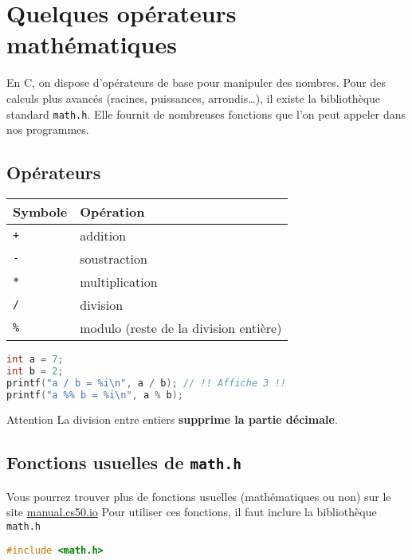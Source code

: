 
\section{Quelques opérateurs mathématiques}

En C, on dispose d’opérateurs de base pour manipuler des nombres.
Pour des calculs plus avancés (racines, puissances, arrondis…), il existe la bibliothèque standard \texttt{math.h}.
Elle fournit de nombreuses fonctions que l’on peut appeler dans nos programmes.
\subsection{Opérateurs}

\begin{center}
	\begin{tabular}{|l|l|}
		\hline
		Symbole     & Opération                             \\
		\hline
		\texttt{+}  & addition                              \\
		\texttt{-}  & soustraction                          \\
		\texttt{*}  & multiplication                        \\
		\texttt{/}  & division                              \\
		\texttt{\%} & modulo (reste de la division entière) \\
		\hline
	\end{tabular}
\end{center}
\begin{lstlisting}[language=c]
int a = 7;
int b = 2;
printf("a / b = %i\n", a / b); // !! Affiche 3 !!
printf("a %% b = %i\n", a % b);
\end{lstlisting}

\begin{UPSTIwarning}{Attention}
	La division entre entiers \textbf{supprime la partie décimale}.
\end{UPSTIwarning}

\subsection{Fonctions usuelles de \texttt{math.h}}

Vous pourrez trouver plus de fonctions usuelles (mathématiques ou non) sur le site \href{https://manual.cs50.io/}{manual.cs50.io}
Pour utiliser ces fonctions, il faut inclure la bibliothèque \texttt{math.h}

\begin{lstlisting}[language=c]
#include <math.h>
\end{lstlisting}

